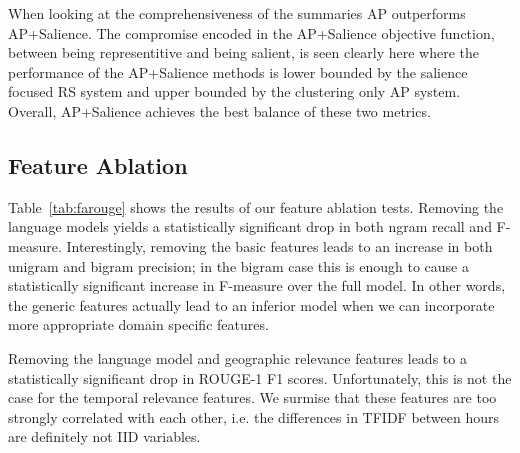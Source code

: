 When looking at the comprehensiveness of the summaries AP outperforms
 AP+Salience. The compromise encoded in the AP+Salience objective
function, between being representitive and being salient, is seen clearly here
where the performance of the AP+Salience methods is lower bounded by 
the salience focused RS
system and upper bounded by the clustering only AP system.
Overall, AP+Salience achieves the best balance of these two metrics.



\subsection{Feature Ablation}


Table~\ref{tab:farouge} shows the results of our feature ablation
tests. Removing the language models yields a statistically 
significant drop in both ngram recall and F-measure. 
Interestingly, removing the basic features leads to an
increase in both unigram and bigram precision; in the bigram
case this is enough to cause a statistically significant increase
in F-measure over the full model. In other words, the generic features
actually lead to an inferior model when we can incorporate more appropriate
domain specific features.

Removing the language model and geographic relevance features leads to a
statistically significant drop in ROUGE-1 F1 scores. Unfortunately,
this is not the case for the temporal relevance features. We surmise that
these features are too strongly correlated with each other, 
i.e. the differences in TFIDF between hours are definitely not IID variables. 




